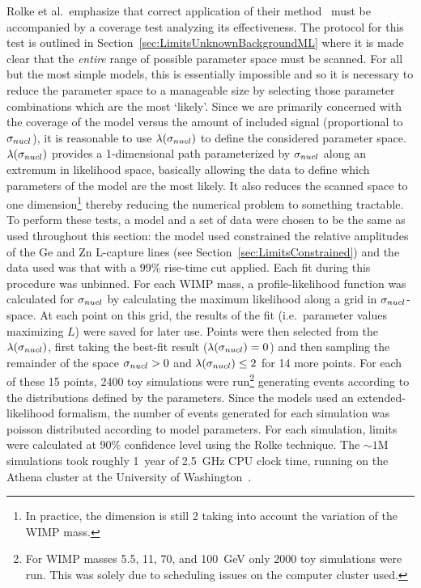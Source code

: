 Rolke et al.~emphasize that correct application of their method~\cite{Rol05} must be accompanied by a coverage test analyzing its effectiveness.  The protocol for this test is outlined in Section~\ref{sec:LimitsUnknownBackgroundML} where it is made clear that the \emph{entire} range of possible parameter space must be scanned.  For all but the most simple models, this is essentially impossible and so it is necessary to reduce the parameter space to a manageable size by selecting those parameter combinations which are the most `likely'.  Since we are primarily concerned with the coverage of the model versus the amount of included signal (proportional to $\sigma_{nucl}$), it is reasonable to use $\lambda(\sigma_{nucl})$ to define the considered parameter space.  $\lambda(\sigma_{nucl})$ provides a 1-dimensional path parameterized by $\sigma_{nucl}$ along an extremum in likelihood space, basically allowing the data to define which parameters of the model are the most likely.  It also reduces the scanned space to one dimension\footnote{In practice, the dimension is still 2 taking into account the variation of the WIMP mass.} thereby reducing the numerical problem to something tractable.  
To perform these tests, a model and a set of data were chosen to be the same as used throughout this section: the model used constrained the relative amplitudes of the Ge and Zn L-capture lines (see Section~\ref{sec:LimitsConstrained}) and the data used was that with a 99\% rise-time cut applied.  Each fit during this procedure was unbinned.  For each WIMP mass, a profile-likelihood function was calculated for $\sigma_{nucl}$ by calculating the maximum likelihood along a grid in $\sigma_{nucl}$-space.  At each point on this grid, the results of the fit (i.e.~parameter values maximizing $L$) were saved for later use.  Points were then selected from the $\lambda(\sigma_{nucl})$, first taking the best-fit result ($\lambda(\sigma_{nucl}) = 0$) and then sampling the remainder of the space $\sigma_{nucl} > 0$ and $\lambda(\sigma_{nucl}) \leq 2$ for 14 more points.  For each of these 15 points, 2400 toy simulations were run\footnote{For WIMP masses 5.5, 11, 70, and 100~GeV only 2000 toy simulations were run.  This was solely due to scheduling issues on the computer cluster used.} generating events according to the distributions defined by the parameters.  Since the models used an extended-likelihood formalism, the number of events generated for each simulation was poisson distributed according to model parameters.  For each simulation, limits were calculated at 90\% confidence level using the Rolke technique.  The $\sim1$M simulations took roughly 1~year of 2.5~GHz CPU clock time, running on the Athena cluster at the University of Washington~\cite{Athena}.  

